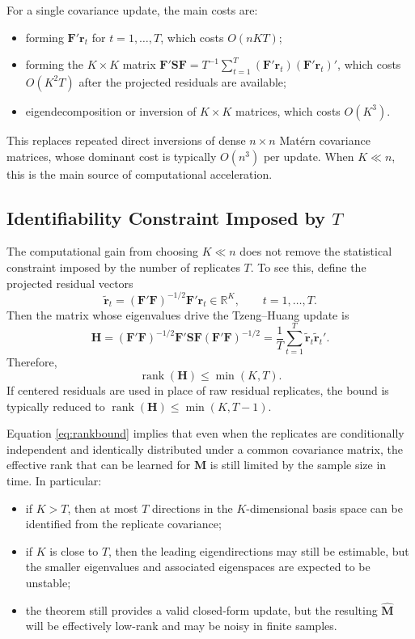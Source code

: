 \documentclass[11pt]{article}
\newcommand{\bF}{\mathbf{F}}
\newcommand{\bH}{\mathbf{H}}
\newcommand{\bM}{\mathbf{M}}
\newcommand{\bS}{\mathbf{S}}
\newcommand{\br}{\mathbf{r}}
\begin{document}
For a single covariance update, the main costs are:
\begin{itemize}[leftmargin=2em]
\item forming $\bF' \br_t$ for $t = 1, \ldots, T$, which costs
$O(nKT)$;
\item forming the $K \times K$ matrix
$\bF' \bS \bF = T^{-1} \sum_{t=1}^T (\bF' \br_t)(\bF' \br_t)'$, which costs
$O(K^2 T)$ after the projected residuals are available;
\item eigendecomposition or inversion of $K \times K$ matrices, which costs
$O(K^3)$.
\end{itemize}
This replaces repeated direct inversions of dense $n \times n$ Mat\'ern
covariance matrices, whose dominant cost is typically $O(n^3)$ per update.
When $K \ll n$, this is the main source of computational acceleration.

\subsection{Identifiability Constraint Imposed by \texorpdfstring{$T$}{T}}

The computational gain from choosing $K \ll n$ does not remove the statistical
constraint imposed by the number of replicates $T$. To see this, define the
projected residual vectors
\[
\widetilde{\br}_t = (\bF' \bF)^{-1/2} \bF' \br_t \in \mathbb{R}^K,
\qquad
t = 1, \ldots, T.
\]
Then the matrix whose eigenvalues drive the Tzeng--Huang update is
\begin{equation}
\bH
=
(\bF' \bF)^{-1/2} \bF' \bS \bF (\bF' \bF)^{-1/2}
=
\frac{1}{T}
\sum_{t=1}^T
\widetilde{\br}_t \widetilde{\br}_t'.
\label{eq:Hdecomp}
\end{equation}
Therefore,
\begin{equation}
\operatorname{rank}(\bH) \le \min(K, T).
\label{eq:rankbound}
\end{equation}
If centered residuals are used in place of raw residual replicates, the bound is
typically reduced to $\operatorname{rank}(\bH) \le \min(K, T-1)$.

Equation \eqref{eq:rankbound} implies that even when the replicates are
conditionally independent and identically distributed under a common covariance
matrix, the effective rank that can be learned for $\bM$ is still limited by the
sample size in time. In particular:
\begin{itemize}[leftmargin=2em]
\item if $K > T$, then at most $T$ directions in the $K$-dimensional basis space
can be identified from the replicate covariance;
\item if $K$ is close to $T$, then the leading eigendirections may still be
estimable, but the smaller eigenvalues and associated eigenspaces are expected
to be unstable;
\item the theorem still provides a valid closed-form update, but the resulting
$\widehat{\bM}$ will be effectively low-rank and may be noisy in finite samples.
\end{itemize}
\end{document}
